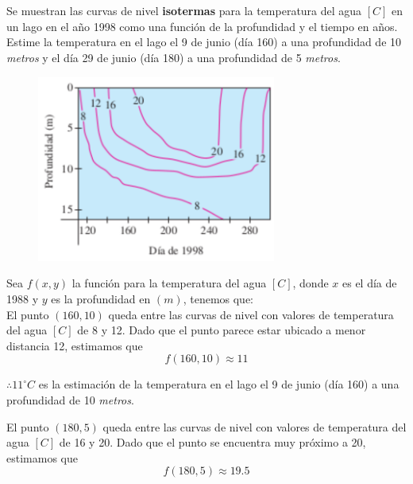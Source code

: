 \documentclass[12pt]{article}
\begin{document}
\section{}

Se muestran las curvas de nivel \textbf{isotermas} para la temperatura del agua $[C]$ en un lago en el año 1998 como una función de la profundidad y el tiempo en años. Estime la temperatura en el lago el 9 de junio (día 160) a una profundidad de 10 \textit{metros} y el día 29 de junio (día 180) a una profundidad de 5 \textit{metros}.

\begin{figure}[H]
  \centering
  \includegraphics[width=0.7\textwidth]{./img/t3_ej2.png}
\end{figure}

Sea $f(x, y)$ la función para la temperatura del agua $[C]$, donde $x$ es el día de 1988 y $y$ es la profundidad en $(m)$, tenemos que: \\

El punto $(160,10)$ queda entre las curvas de nivel con valores de temperatura del agua $[C]$ de 8 y 12. Dado que el punto parece estar ubicado a menor distancia 12, estimamos que $$f(160,10) \approx 11$$

$\therefore {11}^\circ C$ es la estimación de la temperatura en el lago el 9 de junio (día 160) a una profundidad de 10 \textit{metros}.

El punto $(180,5)$ queda entre las curvas de nivel con valores de temperatura del agua $[C]$ de 16 y 20. Dado que el punto se encuentra muy próximo a 20, estimamos que $$f(180,5) \approx 19.5$$
\end{document}
